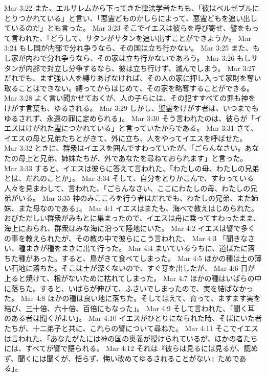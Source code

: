 Mar 3:22  また、エルサレムから下ってきた律法学者たちも、「彼はベルゼブルにとりつかれている」と言い、「悪霊どものかしらによって、悪霊どもを追い出しているのだ」とも言った。
Mar 3:23  そこでイエスは彼らを呼び寄せ、譬をもって言われた、「どうして、サタンがサタンを追い出すことができようか。
Mar 3:24  もし国が内部で分れ争うなら、その国は立ち行かない。
Mar 3:25  また、もし家が内わで分れ争うなら、その家は立ち行かないであろう。
Mar 3:26  もしサタンが内部で対立し分争するなら、彼は立ち行けず、滅んでしまう。
Mar 3:27  だれでも、まず強い人を縛りあげなければ、その人の家に押し入って家財を奪い取ることはできない。縛ってからはじめて、その家を略奪することができる。
Mar 3:28  よく言い聞かせておくが、人の子らには、その犯すすべての罪も神をけがす言葉も、ゆるされる。
Mar 3:29  しかし、聖霊をけがす者は、いつまでもゆるされず、永遠の罪に定められる」。
Mar 3:30  そう言われたのは、彼らが「イエスはけがれた霊につかれている」と言っていたからである。
Mar 3:31  さて、イエスの母と兄弟たちとがきて、外に立ち、人をやってイエスを呼ばせた。
Mar 3:32  ときに、群衆はイエスを囲んですわっていたが、「ごらんなさい。あなたの母上と兄弟、姉妹たちが、外であなたを尋ねておられます」と言った。
Mar 3:33  すると、イエスは彼らに答えて言われた、「わたしの母、わたしの兄弟とは、だれのことか」。
Mar 3:34  そして、自分をとりかこんで、すわっている人々を見まわして、言われた、「ごらんなさい、ここにわたしの母、わたしの兄弟がいる。
Mar 3:35  神のみこころを行う者はだれでも、わたしの兄弟、また姉妹、また母なのである」。
Mar 4:1  イエスはまたも、海べで教えはじめられた。おびただしい群衆がみもとに集まったので、イエスは舟に乗ってすわったまま、海上におられ、群衆はみな海に沿って陸地にいた。
Mar 4:2  イエスは譬で多くの事を教えられたが、その教の中で彼らにこう言われた、
Mar 4:3  「聞きなさい、種まきが種をまきに出て行った。
Mar 4:4  まいているうちに、道ばたに落ちた種があった。すると、鳥がきて食べてしまった。
Mar 4:5  ほかの種は土の薄い石地に落ちた。そこは土が深くないので、すぐ芽を出したが、
Mar 4:6  日が上ると焼けて、根がないために枯れてしまった。
Mar 4:7  ほかの種はいばらの中に落ちた。すると、いばらが伸びて、ふさいでしまったので、実を結ばなかった。
Mar 4:8  ほかの種は良い地に落ちた。そしてはえて、育って、ますます実を結び、三十倍、六十倍、百倍にもなった」。
Mar 4:9  そして言われた、「聞く耳のある者は聞くがよい」。
Mar 4:10  イエスがひとりになられた時、そばにいた者たちが、十二弟子と共に、これらの譬について尋ねた。
Mar 4:11  そこでイエスは言われた、「あなたがたには神の国の奥義が授けられているが、ほかの者たちには、すべてが譬で語られる。
Mar 4:12  それは『彼らは見るには見るが、認めず、聞くには聞くが、悟らず、悔い改めてゆるされることがない』ためである」。
